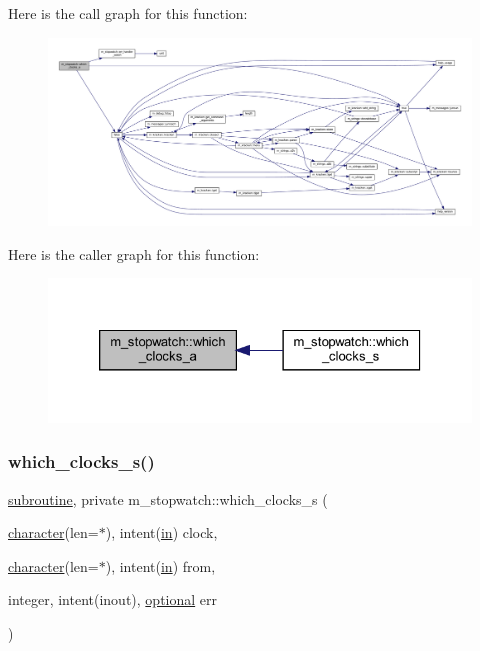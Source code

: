 Here is the call graph for this function\+:
\nopagebreak
\begin{figure}[H]
\begin{center}
\leavevmode
\includegraphics[width=350pt]{namespacem__stopwatch_a38967ac58362f42dc3c5cc27acbdb24f_cgraph}
\end{center}
\end{figure}
Here is the caller graph for this function\+:
\nopagebreak
\begin{figure}[H]
\begin{center}
\leavevmode
\includegraphics[width=326pt]{namespacem__stopwatch_a38967ac58362f42dc3c5cc27acbdb24f_icgraph}
\end{center}
\end{figure}
\mbox{\label{namespacem__stopwatch_a2438913aaa1966dfa18811ff048d642b}} 
\subsubsection{\texorpdfstring{which\+\_\+clocks\+\_\+s()}{which\_clocks\_s()}}
{\footnotesize\ttfamily \hyperlink{M__stopwatch_83_8txt_acfbcff50169d691ff02d4a123ed70482}{subroutine}, private m\+\_\+stopwatch\+::which\+\_\+clocks\+\_\+s (\begin{DoxyParamCaption}\item[{\hyperlink{option__stopwatch_83_8txt_abd4b21fbbd175834027b5224bfe97e66}{character}(len=$\ast$), intent(\hyperlink{M__journal_83_8txt_afce72651d1eed785a2132bee863b2f38}{in})}]{clock,  }\item[{\hyperlink{option__stopwatch_83_8txt_abd4b21fbbd175834027b5224bfe97e66}{character}(len=$\ast$), intent(\hyperlink{M__journal_83_8txt_afce72651d1eed785a2132bee863b2f38}{in})}]{from,  }\item[{integer, intent(inout), \hyperlink{option__stopwatch_83_8txt_aa4ece75e7acf58a4843f70fe18c3ade5}{optional}}]{err }\end{DoxyParamCaption})\hspace{0.3cm}{\ttfamily [private]}}



